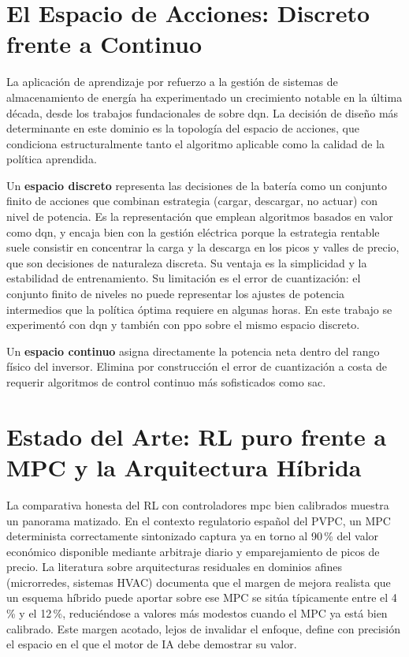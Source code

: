 \documentclass[12pt, a4paper, twoside]{report}
\begin{document}
\section{El Espacio de Acciones: Discreto frente a Continuo}

La aplicación de aprendizaje por refuerzo a la gestión de sistemas de
almacenamiento de energía ha experimentado un crecimiento notable en la última
década, desde los trabajos fundacionales de \citet{Mnih2015} sobre
\acrshort{dqn}. La decisión de diseño más determinante en este dominio es la
topología del espacio de acciones, que condiciona estructuralmente tanto el
algoritmo aplicable como la calidad de la política aprendida.

Un \textbf{espacio discreto} representa las decisiones de la batería como un
conjunto finito de acciones que combinan estrategia (cargar, descargar, no
actuar) con nivel de potencia. Es la representación que emplean algoritmos
basados en valor como \acrshort{dqn}, y encaja bien con la gestión eléctrica
porque la estrategia rentable suele consistir en concentrar la carga y la
descarga en los picos y valles de precio, que son decisiones de naturaleza
discreta. Su ventaja es la simplicidad y la estabilidad de entrenamiento. Su
limitación es el error de cuantización: el conjunto finito de niveles no puede
representar los ajustes de potencia intermedios que la política óptima requiere
en algunas horas. En este trabajo se experimentó con \acrshort{dqn} y también
con \acrshort{ppo} sobre el mismo espacio discreto.

Un \textbf{espacio continuo} asigna directamente la potencia neta dentro del
rango físico del inversor. Elimina por construcción el error de cuantización a
costa de requerir algoritmos de control continuo más sofisticados como
\acrshort{sac}.

\section{Estado del Arte: RL puro frente a MPC y la Arquitectura Híbrida}

La comparativa honesta del RL con controladores \acrshort{mpc} bien calibrados
muestra un panorama matizado. En el contexto regulatorio español del PVPC, un
MPC determinista correctamente sintonizado captura ya en torno al 90\,\% del
valor económico disponible mediante arbitraje diario y emparejamiento de picos
de precio. La literatura sobre arquitecturas residuales en dominios afines
(microrredes, sistemas HVAC) documenta que el margen de mejora realista que un
esquema híbrido puede aportar sobre ese MPC se sitúa típicamente entre el 4\,\%
y el 12\,\%, reduciéndose a valores más modestos cuando el MPC ya está bien
calibrado. Este margen acotado, lejos de invalidar el enfoque, define con
precisión el espacio en el que el motor de IA debe demostrar su valor.
\end{document}

